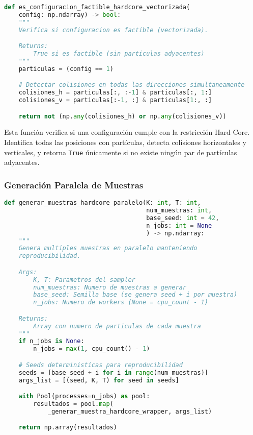 \begin{lstlisting}[language=Python]
def es_configuracion_factible_hardcore_vectorizada(
    config: np.ndarray) -> bool:
    """
    Verifica si configuracion es factible (vectorizada).

    Returns:
        True si es factible (sin particulas adyacentes)
    """
    particulas = (config == 1)

    # Detectar colisiones en todas las direcciones simultaneamente
    colisiones_h = particulas[:, :-1] & particulas[:, 1:]
    colisiones_v = particulas[:-1, :] & particulas[1:, :]

    return not (np.any(colisiones_h) or np.any(colisiones_v))
\end{lstlisting}

Esta función verifica si una configuración cumple con la restricción Hard-Core. Identifica todas las posiciones con partículas, detecta colisiones horizontales y verticales, y retorna \texttt{True} únicamente si no existe ningún par de partículas adyacentes.

\subsubsection{Generación Paralela de Muestras}

\begin{lstlisting}[language=Python]
def generar_muestras_hardcore_paralelo(K: int, T: int,
                                       num_muestras: int,
                                       base_seed: int = 42,
                                       n_jobs: int = None
                                       ) -> np.ndarray:
    """
    Genera multiples muestras en paralelo manteniendo
    reproducibilidad.

    Args:
        K, T: Parametros del sampler
        num_muestras: Numero de muestras a generar
        base_seed: Semilla base (se genera seed + i por muestra)
        n_jobs: Numero de workers (None = cpu_count - 1)

    Returns:
        Array con numero de particulas de cada muestra
    """
    if n_jobs is None:
        n_jobs = max(1, cpu_count() - 1)

    # Seeds deterministicas para reproducibilidad
    seeds = [base_seed + i for i in range(num_muestras)]
    args_list = [(seed, K, T) for seed in seeds]

    with Pool(processes=n_jobs) as pool:
        resultados = pool.map(
            _generar_muestra_hardcore_wrapper, args_list)

    return np.array(resultados)
\end{lstlisting}

